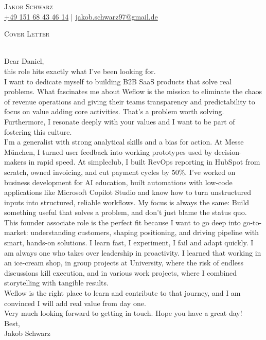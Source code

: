 \documentclass[a4paper]{article}
\newcommand{\lineunder} {
    \vspace*{-8pt} \\
    \hspace*{-18pt} \hrulefill \\
}
\newcommand{\header} [1] {
    {\hspace*{-18pt}\vspace*{6pt} \textsc{#1}}
    \vspace*{-6pt} \lineunder
}
\begin{document}
\vspace*{-40pt}
    

\vspace*{-10pt}
\begin{center}
	{\Huge \scshape {Jakob Schwarz}}\\
	\href{tel:+4915168434614}{+49 151 68 43 46 14} | \href{mailto:jakob.schwarz97@gmail.de}{jakob.schwarz97@gmail.de} %
\end{center}

\header{Cover Letter}
\vspace{2mm}

Dear Daniel, \\ [1em]

this role hits exactly what I’ve been looking for. \\ [1em]

I want to dedicate myself to building B2B SaaS products that solve real problems. What fascinates me about Weflow is the mission to eliminate the chaos of revenue operations and giving their teams transparency and predictability to focus on value adding core activities. That’s a problem worth solving. Furthermore, I resonate deeply with your values and I want to be part of fostering this culture. \\ [1em]

I’m a generalist with strong analytical skills and a bias for action. At Messe München, I turned user feedback into working prototypes used by decision-makers in rapid speed. At simpleclub, I built RevOps reporting in HubSpot from scratch, owned invoicing, and cut payment cycles by 50\%. I’ve worked on business development for AI education, built automations with low-code applications like Microsoft Copilot Studio and know how to turn unstructured inputs into structured, reliable workflows. My focus is always the same: Build something useful that solves a problem, and don't just blame the status quo. \\ [1em]

This founder associate role is the perfect fit because I want to go deep into go-to-market: understanding customers, shaping positioning, and driving pipeline with smart, hands-on solutions. I learn fast, I experiment, I fail and adapt quickly. I am always one who takes over leadership in proactivity. I learned that working in an ice-cream shop, in group projects at University, where the risk of endless discussions kill execution, and in various work projects, where I combined storytelling with tangible results. \\ [1em]

Weflow is the right place to learn and contribute to that journey, and I am convinced I will add real value from day one. \\ [1em]

Very much looking forward to getting in touch. Hope you have a great day! \\ [1em]

Best, \\ [1em]
Jakob Schwarz


\vspace{2mm}


\ 
\end{document}
